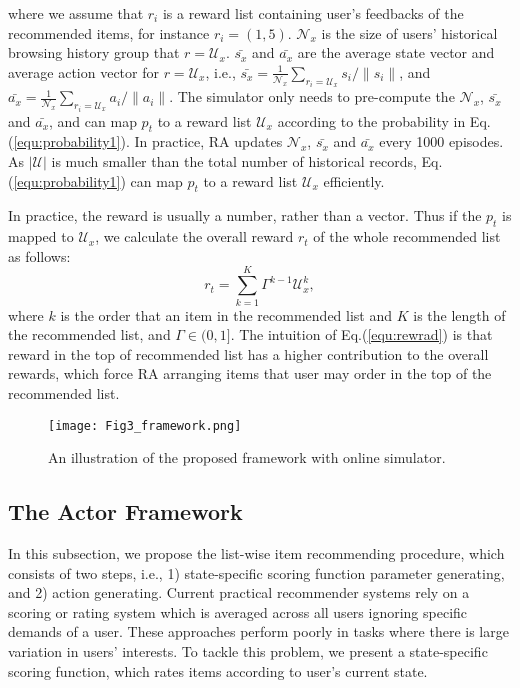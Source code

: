  where we assume that $r_i$ is a reward list containing user's feedbacks of the recommended items, for instance $r_i = (1,5)$. $\mathcal{N}_x$ is the size of users' historical browsing history group that $r  = \mathcal{U}_x$. $\bar{s_x} $ and $\bar{a_x}$ are the average state vector and average action vector for $r  = \mathcal{U}_x$, i.e., $\bar{s_x} = \frac{1}{\mathcal{N}_x}\sum_{r_i  = \mathcal{U}_x}s_i/\|s_i\|$, and $\bar{a_x} = \frac{1}{\mathcal{N}_x}\sum_{r_i  = \mathcal{U}_x}a_i/\|a_i\|$.  The simulator only needs to pre-compute the $\mathcal{N}_x$, $\bar{s_x} $ and $\bar{a_x}$, and can map $p_t$ to a reward list $\mathcal{U}_x$ according to the probability in Eq.(\ref{equ:probability1}). In practice, RA updates $\mathcal{N}_x$, $\bar{s_x} $ and $\bar{a_x}$ every 1000 episodes. As $|\mathcal{U}|$ is much smaller than the total number of historical records, Eq.(\ref{equ:probability1}) can map $p_t$ to a reward list $\mathcal{U}_x$ efficiently.
  
In practice, the reward is usually a number, rather than a vector. Thus if the $p_t$ is mapped to $\mathcal{U}_x$, we calculate the overall reward $r_t$ of the whole recommended list as follows:
\begin{equation}\label{equ:rewrad}
r_t=\sum_{k= 1}^K \Gamma^{k-1}\mathcal{U}_x^k, 
\end{equation}
where $k$ is the order that an item in the recommended list and $K$ is the length of the recommended list, and $\Gamma \in (0, 1]$. The intuition of Eq.(\ref{equ:rewrad}) is that reward in the top of recommended list has a higher contribution to the overall rewards, which force RA arranging items that user may order in the top of the recommended list.

\begin{figure*}[t]
	\centering
	\texttt{[image: Fig3\_framework.png]}
	\caption{An illustration of the proposed framework with online simulator.\label{fig:framework}}
\end{figure*}

\subsection{The Actor Framework}
\label{sec:actor}
In this subsection, we propose the list-wise item recommending procedure, which consists of two steps, i.e., 1) state-specific scoring function parameter generating, and 2) action generating. Current practical recommender systems rely on a scoring or rating system which is averaged across all users ignoring specific demands of a user. These approaches perform poorly in tasks where there is large variation in users' interests. To tackle this problem, we present a state-specific scoring function, which rates items according to user's current state. 

